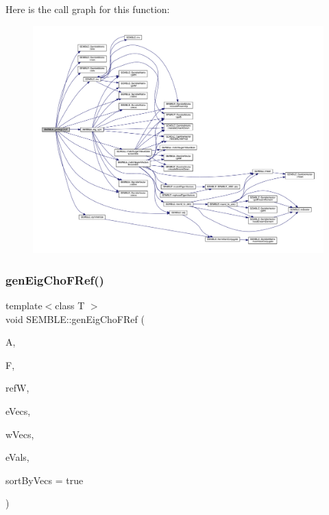 Here is the call graph for this function\+:
\nopagebreak
\begin{figure}[H]
\begin{center}
\leavevmode
\includegraphics[width=350pt]{d7/dfd/namespaceSEMBLE_a1b40b7a94a31839494c7e3c119384dfc_cgraph}
\end{center}
\end{figure}
\mbox{\label{namespaceSEMBLE_a9dcee3599c76380594ebea593dc26a15}} 
\subsubsection{\texorpdfstring{genEigChoFRef()}{genEigChoFRef()}}
{\footnotesize\ttfamily template$<$class T $>$ \\
void S\+E\+M\+B\+L\+E\+::gen\+Eig\+Cho\+F\+Ref (\begin{DoxyParamCaption}\item[{const \mbox{\hyperlink{structSEMBLE_1_1SembleMatrix}{Semble\+Matrix}}$<$ T $>$ \&}]{A,  }\item[{const \mbox{\hyperlink{structSEMBLE_1_1SembleMatrix}{Semble\+Matrix}}$<$ T $>$ \&}]{F,  }\item[{const \mbox{\hyperlink{structSEMBLE_1_1SembleMatrix}{Semble\+Matrix}}$<$ T $>$ \&}]{refW,  }\item[{\mbox{\hyperlink{structSEMBLE_1_1SembleMatrix}{Semble\+Matrix}}$<$ T $>$ \&}]{e\+Vecs,  }\item[{\mbox{\hyperlink{structSEMBLE_1_1SembleMatrix}{Semble\+Matrix}}$<$ T $>$ \&}]{w\+Vecs,  }\item[{\mbox{\hyperlink{structSEMBLE_1_1SembleVector}{Semble\+Vector}}$<$ double $>$ \&}]{e\+Vals,  }\item[{const bool}]{sort\+By\+Vecs = {\ttfamily true} }\end{DoxyParamCaption})}

